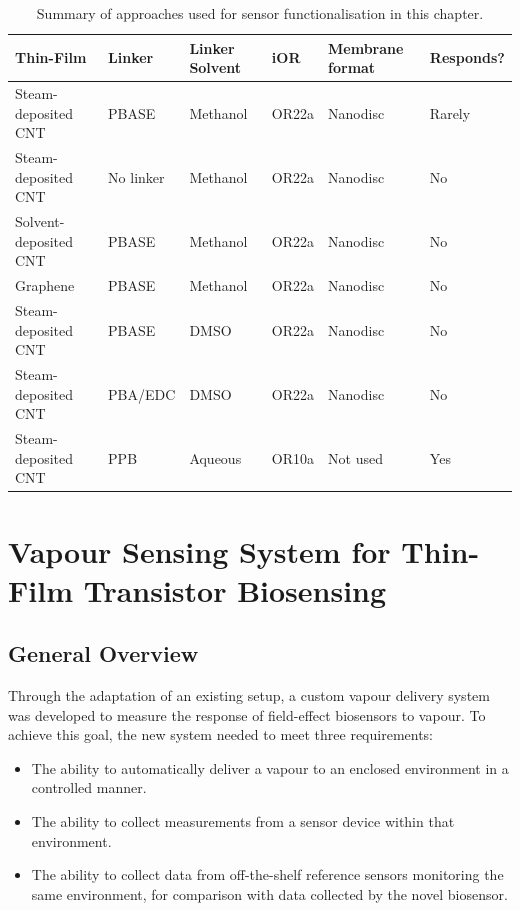 \documentclass[
  a4paper,
]{scrbook}
\begin{document}
\hypertarget{tbl-method-summary}{}
\begin{longtable}[t]{>{\raggedright\arraybackslash}p{4.5cm}>{\raggedright\arraybackslash}p{1.6cm}>{\raggedright\arraybackslash}p{1.6cm}>{\raggedright\arraybackslash}p{1cm}>{\raggedright\arraybackslash}p{1.5cm}l}
\caption{\label{tbl-method-summary}Summary of approaches used for sensor functionalisation in this chapter. }\tabularnewline

\toprule
Thin-Film & Linker & Linker Solvent & iOR & Membrane format & Responds?\\
\midrule
Steam-deposited CNT & PBASE & Methanol & OR22a & Nanodisc & Rarely\\
Steam-deposited CNT & No linker & Methanol & OR22a & Nanodisc & No\\
Solvent-deposited CNT & PBASE & Methanol & OR22a & Nanodisc & No\\
Graphene & PBASE & Methanol & OR22a & Nanodisc & No\\
Steam-deposited CNT & PBASE & DMSO & OR22a & Nanodisc & No\\
\addlinespace
Steam-deposited CNT & PBA/EDC & DMSO & OR22a & Nanodisc & No\\
Steam-deposited CNT & PPB & Aqueous & OR10a & Not used & Yes\\
\bottomrule
\end{longtable}


\hypertarget{sec-vapour-sensing-biosensors}{%
\chapter{Vapour Sensing System for Thin-Film Transistor
Biosensing}\label{sec-vapour-sensing-biosensors}}

\hypertarget{general-overview-1}{%
\section{General Overview}\label{general-overview-1}}

Through the adaptation of an existing setup, a custom vapour delivery
system was developed to measure the response of field-effect biosensors
to vapour. To achieve this goal, the new system needed to meet three
requirements:

\begin{itemize}
\item
  The ability to automatically deliver a vapour to an enclosed
  environment in a controlled manner.
\item
  The ability to collect measurements from a sensor device within that
  environment.
\item
  The ability to collect data from off-the-shelf reference sensors
  monitoring the same environment, for comparison with data collected by
  the novel biosensor.
\end{itemize}
\end{document}
